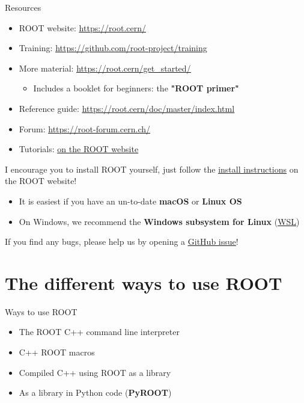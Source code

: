 \documentclass[aspectratio=169]{beamer}
\newcommand{\myhref}[2]{{\color{blue}\href{#1}{\underline{#2}}}}
\begin{document}
\begin{frame}{Resources}
\begin{itemize}
    \item ROOT website: \myhref{https://root.cern/}{https://root.cern/}
    \item Training: \myhref{https://github.com/root-project/training}{https://github.com/root-project/training}
    \item More material: \myhref{https://root.cern/get_started/}{https://root.cern/get\_started/}
    \begin{itemize}
        \item Includes a booklet for beginners: the \textbf{"ROOT primer"}
    \end{itemize}
    \item Reference guide: \myhref{https://root.cern/doc/master/index.html}{https://root.cern/doc/master/index.html}
    \item Forum: \myhref{https://root-forum.cern.ch/}{https://root-forum.cern.ch/}
    \item Tutorials: \myhref{https://root.cern/doc/master/group__Tutorials.html}{on the ROOT website}
\end{itemize}
    \vspace{3mm}
I encourage you to install ROOT yourself, just follow the \myhref{https://root.cern/install/}{install instructions} on the ROOT website!
    \begin{itemize}
        \item It is easiest if you have an un-to-date \textbf{macOS} or \textbf{Linux OS}
        \item On Windows, we recommend the \textbf{Windows subsystem for Linux} (\myhref{https://docs.microsoft.com/en-us/windows/wsl/about}{WSL})
    \end{itemize}
    \vspace{3mm}
    If you find any bugs, please help us by opening a \myhref{https://github.com/root-project/root/issues}{GitHub issue}!
\end{frame}

\section{The different ways to use ROOT}

\begin{frame}{Ways to use ROOT}
\begin{itemize}
    \item The ROOT C++ command line interpreter
    \item C++ ROOT macros
    \item Compiled C++ using ROOT as a library
    \item As a library in Python code (\textbf{PyROOT})
\end{itemize}
\end{frame}
\end{document}
